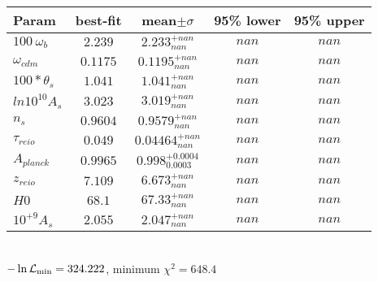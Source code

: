 \begin{tabular}{|l|c|c|c|c|} 
 \hline 
Param & best-fit & mean$\pm\sigma$ & 95\% lower & 95\% upper \\ \hline 
$100~\omega{}_{b }$ &$2.239$ & $2.233_{nan}^{+nan}$ & $nan$ & $nan$ \\ 
$\omega{}_{cdm }$ &$0.1175$ & $0.1195_{nan}^{+nan}$ & $nan$ & $nan$ \\ 
$100*\theta{}_{s }$ &$1.041$ & $1.041_{nan}^{+nan}$ & $nan$ & $nan$ \\ 
$ln10^{10}A_{s }$ &$3.023$ & $3.019_{nan}^{+nan}$ & $nan$ & $nan$ \\ 
$n_{s }$ &$0.9604$ & $0.9579_{nan}^{+nan}$ & $nan$ & $nan$ \\ 
$\tau{}_{reio }$ &$0.049$ & $0.04464_{nan}^{+nan}$ & $nan$ & $nan$ \\ 
$A_{planck }$ &$0.9965$ & $0.998_{0.0003}^{+0.0004}$ & $nan$ & $nan$ \\ 
$z_{reio }$ &$7.109$ & $6.673_{nan}^{+nan}$ & $nan$ & $nan$ \\ 
$H0$ &$68.1$ & $67.33_{nan}^{+nan}$ & $nan$ & $nan$ \\ 
$10^{+9}A_{s }$ &$2.055$ & $2.047_{nan}^{+nan}$ & $nan$ & $nan$ \\ 
\hline 
 \end{tabular} \\ 
$-\ln{\cal L}_\mathrm{min} =324.222$, minimum $\chi^2=648.4$ \\ 
